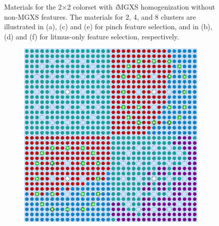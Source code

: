 \begin{appendices}
\begin{figure}[h!]
\begin{subfigure}{0.48\textwidth}
  \caption{}
  \label{fig:no-features-assm-2x2-combined-8}
\end{subfigure}
\caption[Clustered geometries without non-MGXS features]{Materials for the 2$\times$2 colorset with \textit{i}\ac{MGXS} homogenization without non-\ac{MGXS} features. The materials for 2, 4, and 8 clusters are illustrated in (a), (c) and (e) for pinch feature selection, and in (b), (d) and (f) for litmus-only feature selection, respectively.}
\label{fig:no-features-2x2-geometries}
\end{figure}

\clearpage

\begin{figure}[h!]
\centering
\begin{subfigure}{0.48\textwidth}
  \centering
  \includegraphics[width=0.85\linewidth]{figures/unsupervised/geometries/without-features/2-clusters/pinch/reflector}
  \caption{}
  \label{fig:no-features-reflector-pinch-2}
\end{subfigure}%
\begin{subfigure}{0.48\textwidth}
  \centering

\end{subfigure}
\end{figure}
\end{appendices}
